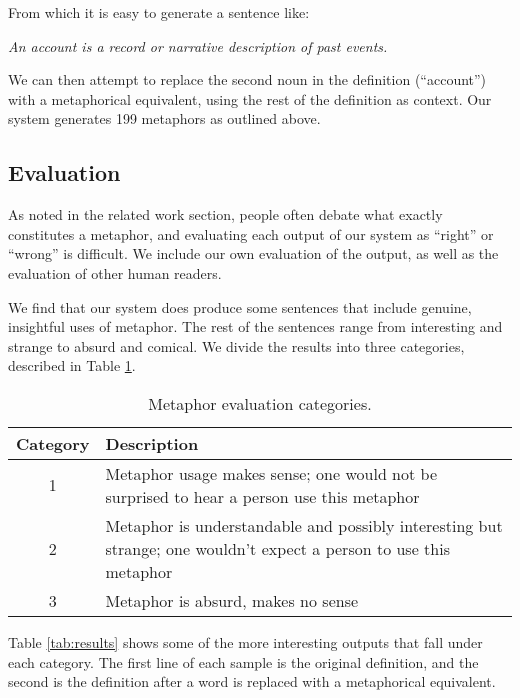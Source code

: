 \documentclass[12pt]{article}
\begin{document}
From which it is easy to generate a sentence like:

\begin{center}
    \emph{An account is a record or narrative description of past events.}
\end{center}

We can then attempt to replace the second noun in the definition (``account'') with a metaphorical equivalent, using the rest of the definition as context. Our system generates 199 metaphors as outlined above.

\subsection{Evaluation}

As noted in the related work section, people often debate what exactly constitutes a metaphor, and evaluating each output of our system as ``right'' or ``wrong'' is difficult. We include our own evaluation of the output, as well as the evaluation of other human readers.

We find that our system does produce some sentences that include genuine, insightful uses of metaphor. The rest of the sentences range from interesting and strange to absurd and comical. We divide the results into three categories, described in Table \ref{tab:evalcats}.

\begin{table}[h]
	\centering
	\small
	\begin{tabular}{|c|p{12cm}|} \hline
		\textbf{Category} & \textbf{Description}\\ \hline
		1 & Metaphor usage makes sense; one would not be surprised to hear a person use this metaphor\\ \hline
        2 & Metaphor is understandable and possibly interesting but strange; one wouldn’t expect a person to use this metaphor\\ \hline
		3 & Metaphor is absurd, makes no sense\\ \hline
	\end{tabular}
	\caption{Metaphor evaluation categories.}
	\label{tab:evalcats}
\end{table}

Table \ref{tab:results} shows some of the more interesting outputs that fall under each category. The first line of each sample is the original definition, and the second is the definition after a word is replaced with a metaphorical equivalent.
\end{document}
